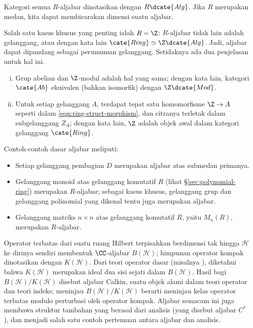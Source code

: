 Kategori semua $R$-aljabar dinotasikan dengan $R\dcate{Alg}$. Jika $R$ merupakan medan, kita dapat membicarakan dimensi suatu aljabar.
\begin{remark}
	Salah satu kasus khusus yang penting ialah $R = \Z$: $R$-aljabar tidak lain adalah gelanggang, atau dengan kata lain $\cate{Ring} \simeq \Z\dcate{Alg}$. Jadi, aljabar dapat dipandang sebagai perumuman gelanggang. Setidaknya ada dua penjelasan untuk hal ini.
	\begin{enumerate}[(i)]
		\item Grup abelian dan $\Z$-modul adalah hal yang sama; dengan kata lain, kategori $\cate{Ab}$ ekuivalen (bahkan isomorfik) dengan $\Z\dcate{Mod}$.
		\item Untuk setiap gelanggang $A$, terdapat tepat satu homomorfisme $\Z \to A$ seperti dalam \eqref{eqn:ring-struct-morphism}, dan citranya terletak dalam subgelanggang $Z_A$; dengan kata lain, $\Z$ adalah objek awal dalam kategori gelanggang $\cate{Ring}$.
	\end{enumerate}
\end{remark}

Contoh-contoh dasar aljabar meliputi:
\begin{itemize}
	\item Setiap gelanggang pembagian $D$ merupakan aljabar atas submedan primanya.
	\item Gelanggang monoid atas gelanggang komutatif $R$ (lihat \S\ref{sec:polynomial-ring}) merupakan $R$-aljabar; sebagai kasus khusus, gelanggang grup dan gelanggang polinomial yang dikenal tentu juga merupakan aljabar.
	\item Gelanggang matriks $n \times n$ atas gelanggang komutatif $R$, yaitu $M_n(R)$, merupakan $R$-aljabar.
\end{itemize}

\begin{example}
	Operator terbatas dari suatu ruang Hilbert terpisahkan berdimensi tak hingga $\mathcal{H}$ ke dirinya sendiri membentuk $\CC$-aljabar $B(\mathcal{H})$; himpunan operator kompak dinotasikan dengan $K(\mathcal{H})$. Dari teori operator dasar (misalnya \cite[\S 4.1]{Zh1}), diketahui bahwa $K(\mathcal{H})$ merupakan ideal dua sisi sejati dalam $B(\mathcal{H})$. Hasil bagi $B(\mathcal{H})/K(\mathcal{H})$ disebut aljabar Calkin, suatu objek alami dalam teori operator dan teori indeks; meninjau $B(\mathcal{H})/K(\mathcal{H})$ berarti meninjau kelas operator terbatas modulo perturbasi oleh operator kompak. Aljabar semacam ini juga membawa struktur tambahan yang berasal dari analisis (yang disebut aljabar $C^*$), dan menjadi salah satu contoh pertemuan antara aljabar dan analisis.
\end{example}

